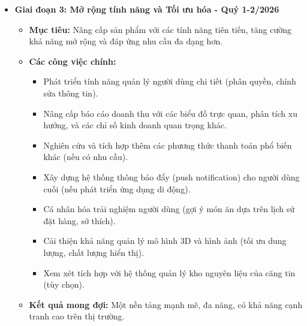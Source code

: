 \documentclass[12pt,a4paper]{article}
\begin{document}
\begin{itemize}[label=\textbullet]
    \item \textbf{Giai đoạn 3: Mở rộng tính năng và Tối ưu hóa - Quý 1-2/2026}
    \begin{itemize}[label=\textendash]
        \item \textbf{Mục tiêu:} Nâng cấp sản phẩm với các tính năng tiên tiến, tăng cường khả năng mở rộng và đáp ứng nhu cầu đa dạng hơn.
        \item \textbf{Các công việc chính:}
        \begin{itemize}[label=\textrightarrow]
            \item Phát triển tính năng quản lý người dùng chi tiết (phân quyền, chỉnh sửa thông tin).
            \item Nâng cấp báo cáo doanh thu với các biểu đồ trực quan, phân tích xu hướng, và các chỉ số kinh doanh quan trọng khác.
            \item Nghiên cứu và tích hợp thêm các phương thức thanh toán phổ biến khác (nếu có nhu cầu).
            \item Xây dựng hệ thống thông báo đẩy (push notification) cho người dùng cuối (nếu phát triển ứng dụng di động).
            \item Cá nhân hóa trải nghiệm người dùng (gợi ý món ăn dựa trên lịch sử đặt hàng, sở thích).
            \item Cải thiện khả năng quản lý mô hình 3D và hình ảnh (tối ưu dung lượng, chất lượng hiển thị).
            \item Xem xét tích hợp với hệ thống quản lý kho nguyên liệu của căng tin (tùy chọn).
        \end{itemize}
        \item \textbf{Kết quả mong đợi:} Một nền tảng mạnh mẽ, đa năng, có khả năng cạnh tranh cao trên thị trường.
    \end{itemize}


\end{itemize}
\end{document}
